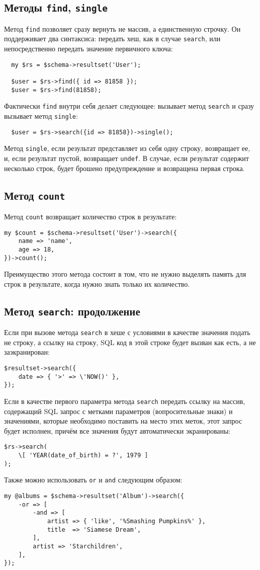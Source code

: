 \subsection{Методы \texttt{find}, \texttt{single}}
Метод \verb|find| позволяет сразу вернуть не массив, а единственную строчку. Он поддерживает два синтаксиса: передать хеш, как в случае \verb|search|, или непосредственно передать значение первичного ключа:
\begin{verbatim}
  my $rs = $schema->resultset('User');

  $user = $rs->find({ id => 81858 });
  $user = $rs->find(81858);
\end{verbatim}
Фактически \verb|find| внутри себя делает следующее: вызывает метод \verb|search| и сразу вызывает метод \verb|single|:
\begin{verbatim}
  $user = $rs->search({id => 81858})->single();
\end{verbatim}
Метод \verb|single|, если результат представляет из себя одну строку, возвращает ее, и, если результат пустой, возвращает \verb|undef|. В случае, если результат содержит несколько строк, будет брошено предупреждение и возвращена первая строка.

\subsection{Метод \texttt{count}}
Метод \verb|count| возвращает количество строк в результате:
\begin{verbatim}
my $count = $schema->resultset('User')->search({
    name => 'name',
    age => 18,
})->count();
\end{verbatim}
Преимущество этого метода состоит в том, что не нужно выделять память для строк в результате, когда нужно знать только их количество.


\subsection{Метод \texttt{search}: продолжение}
Если при вызове метода \verb|search| в хеше с условиями в качестве значения подать не строку, а ссылку на строку, SQL код в этой строке будет вызван как есть, а не заэкранирован:
\begin{verbatim}
$resultset->search({
    date => { '>' => \'NOW()' },
});
\end{verbatim}
Если в качестве первого параметра метода \verb|search| передать ссылку на массив, содержащий SQL запрос с метками параметров (вопросительные знаки) и значениями, которые необходимо поставить на место этих меток, этот запрос будет исполнен, причём все значения будут автоматически экранированы:
\begin{verbatim}
$rs->search(
    \[ 'YEAR(date_of_birth) = ?', 1979 ]
);
\end{verbatim}
Также можно использовать \verb|or| и \verb|and| следующим образом:
\begin{verbatim}
my @albums = $schema->resultset('Album')->search({
    -or => [
        -and => [
            artist => { 'like', '%Smashing Pumpkins%' },
            title  => 'Siamese Dream',
        ],
        artist => 'Starchildren',
    ],
});
\end{verbatim}

